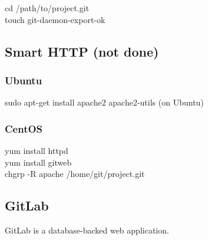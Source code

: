 \documentclass[11pt]{article}
\begin{document}
cd /path/to/project.git\\
touch git-daemon-export-ok\\

\subsection{Smart HTTP (not done)}
\label{sec:org233152b}

\subsubsection{Ubuntu}
\label{sec:org74ad546}
sudo apt-get install apache2 apache2-utils (on Ubuntu)\\

\subsubsection{CentOS}
\label{sec:org83c498f}
yum install httpd\\
yum install gitweb\\

chgrp -R apache /home/git/project.git\\

\subsection{GitLab}
\label{sec:org771cf30}
GitLab is a database-backed web application.\\
\end{document}
